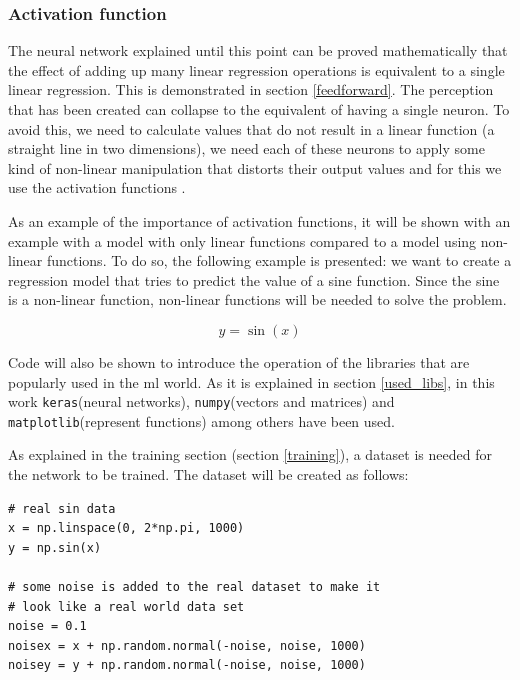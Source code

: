 \subsubsection{Activation function}\label{activationfunction}

The neural network explained until this point can be proved mathematically that the effect of adding up many linear regression operations is equivalent to a single linear regression. This is demonstrated in section \ref{feedforward}. The perception that has been created can collapse to the equivalent of having a single neuron. To avoid this, we need to calculate values that do not result in a linear function (a straight line in two dimensions), we need each of these neurons to apply some kind of non-linear manipulation that distorts their output values and for this we use the activation functions \cite{nielsen}.
\newline


As an example of the importance of activation functions, it will be shown with an example with a model with only linear functions compared to a model using non-linear functions. To do so, the following example is presented: we want to create a regression model that tries to predict the value of a sine function. Since the sine is a non-linear function, non-linear functions will be needed to solve the problem.

\begin{equation}
    y = \sin(x)
\end{equation}


Code will also be shown to introduce the operation of the libraries that are popularly used in the \acrlong{ml} world. As it is explained in section \ref{used_libs}, in this work \small{\verb|keras|}\normalsize (neural networks), \small{\verb|numpy|}\normalsize (vectors and matrices) and \small{\verb|matplotlib|}\normalsize (represent functions) among others have been used.
\newline

As explained in the training section (section \ref{training}), a dataset is needed for the network to be trained. The dataset will be created as follows:

\begin{verbatim}
# real sin data
x = np.linspace(0, 2*np.pi, 1000)
y = np.sin(x)

# some noise is added to the real dataset to make it 
# look like a real world data set
noise = 0.1
noisex = x + np.random.normal(-noise, noise, 1000)
noisey = y + np.random.normal(-noise, noise, 1000)
\end{verbatim}

